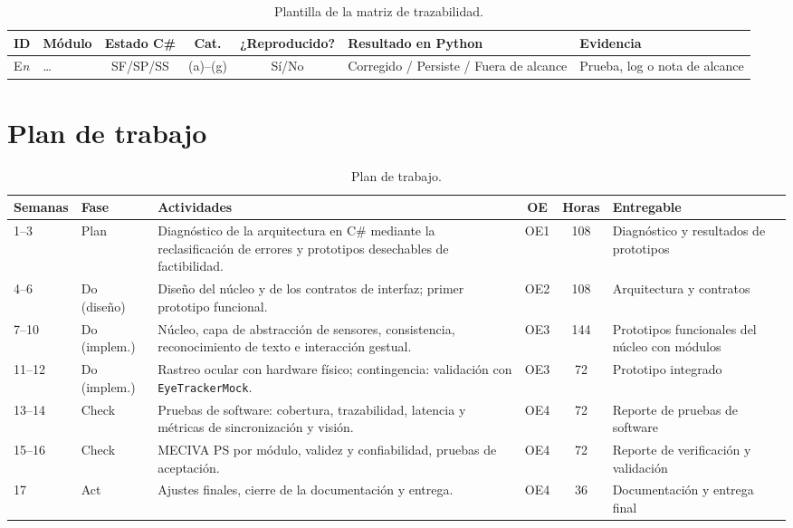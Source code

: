 \begin{table}[H]
\centering
\caption{Plantilla de la matriz de trazabilidad.}
\label{tab:plantilla_traz}
\footnotesize
\begin{tabularx}{\textwidth}{l l c c c >{\raggedright\arraybackslash}X >{\raggedright\arraybackslash}X}
\toprule
\textbf{ID} & \textbf{Módulo} & \textbf{Estado C\#} & \textbf{Cat.} & \textbf{¿Reproducido?} & \textbf{Resultado en Python} & \textbf{Evidencia} \\ \midrule
E\textit{n} & \dots & SF/SP/SS & (a)--(g) & Sí/No & Corregido / Persiste / Fuera de alcance & Prueba, log o nota de alcance \\ \bottomrule
\end{tabularx}
\end{table}

\chapter{Plan de trabajo}
\label{an:plan}

\begin{table}[H]
\centering
\caption{Plan de trabajo.}
\label{tab:plan_trabajo}
\footnotesize
\begin{tabularx}{\textwidth}{l l >{\raggedright\arraybackslash}X c c >{\raggedright\arraybackslash}p{3cm}}
\toprule
\textbf{Semanas} & \textbf{Fase} & \textbf{Actividades} & \textbf{OE} & \textbf{Horas} & \textbf{Entregable} \\ \midrule
1--3 & Plan & Diagnóstico de la arquitectura en C\# mediante la reclasificación de errores y prototipos desechables de factibilidad. & OE1 & 108 & Diagnóstico y resultados de prototipos \\ \midrule
4--6 & Do (diseño) & Diseño del núcleo y de los contratos de interfaz; primer prototipo funcional. & OE2 & 108 & Arquitectura y contratos \\ \midrule
7--10 & Do (implem.) & Núcleo, capa de abstracción de sensores, consistencia, reconocimiento de texto e interacción gestual. & OE3 & 144 & Prototipos funcionales del núcleo con módulos \\ \midrule
11--12 & Do (implem.) & Rastreo ocular con hardware físico; contingencia: validación con \texttt{EyeTrackerMock}. & OE3 & 72 & Prototipo integrado \\ \midrule
13--14 & Check & Pruebas de software: cobertura, trazabilidad, latencia y métricas de sincronización y visión. & OE4 & 72 & Reporte de pruebas de software \\ \midrule
15--16 & Check & MECIVA PS por módulo, validez y confiabilidad, pruebas de aceptación. & OE4 & 72 & Reporte de verificación y validación \\ \midrule
17 & Act & Ajustes finales, cierre de la documentación y entrega. & OE4 & 36 & Documentación y entrega final \\ \bottomrule
\end{tabularx}
\end{table}

